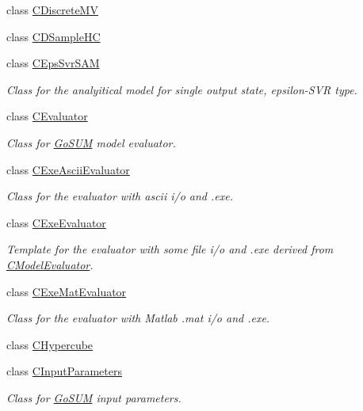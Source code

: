 \begin{DoxyCompactItemize}
\item 
class \hyperlink{class_go_s_u_m_1_1_c_discrete_m_v}{C\-Discrete\-M\-V}
\item 
class \hyperlink{class_go_s_u_m_1_1_c_d_sample_h_c}{C\-D\-Sample\-H\-C}
\item 
class \hyperlink{class_go_s_u_m_1_1_c_eps_svr_s_a_m}{C\-Eps\-Svr\-S\-A\-M}
\begin{DoxyCompactList}\small\item\em Class for the analyitical model for single output state, epsilon-\/\-S\-V\-R type. \end{DoxyCompactList}\item 
class \hyperlink{class_go_s_u_m_1_1_c_evaluator}{C\-Evaluator}
\begin{DoxyCompactList}\small\item\em Class for \hyperlink{struct_go_s_u_m}{Go\-S\-U\-M} model evaluator. \end{DoxyCompactList}\item 
class \hyperlink{class_go_s_u_m_1_1_c_exe_ascii_evaluator}{C\-Exe\-Ascii\-Evaluator}
\begin{DoxyCompactList}\small\item\em Class for the evaluator with ascii i/o and .exe. \end{DoxyCompactList}\item 
class \hyperlink{class_go_s_u_m_1_1_c_exe_evaluator}{C\-Exe\-Evaluator}
\begin{DoxyCompactList}\small\item\em Template for the evaluator with some file i/o and .exe derived from \hyperlink{class_go_s_u_m_1_1_c_model_evaluator}{C\-Model\-Evaluator}. \end{DoxyCompactList}\item 
class \hyperlink{class_go_s_u_m_1_1_c_exe_mat_evaluator}{C\-Exe\-Mat\-Evaluator}
\begin{DoxyCompactList}\small\item\em Class for the evaluator with Matlab .mat i/o and .exe. \end{DoxyCompactList}\item 
class \hyperlink{class_go_s_u_m_1_1_c_hypercube}{C\-Hypercube}
\item 
class \hyperlink{class_go_s_u_m_1_1_c_input_parameters}{C\-Input\-Parameters}
\begin{DoxyCompactList}\small\item\em Class for \hyperlink{struct_go_s_u_m}{Go\-S\-U\-M} input parameters. \end{DoxyCompactList}\item 

\end{DoxyCompactItemize}
